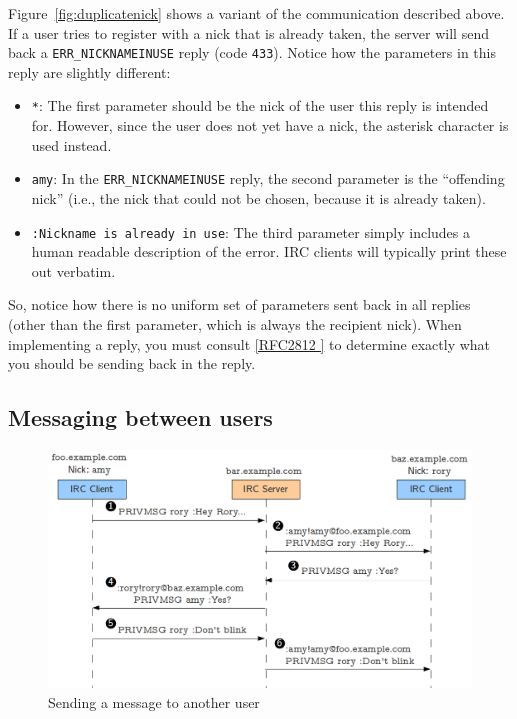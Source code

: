 \documentclass[10pt]{article}
\newcommand{\RFCsection}[2]{\href{http://tools.ietf.org/html/rfc#1\#section-#2}{[RFC#1 \textsection #2]}}
\begin{document}
Figure~\ref{fig:duplicatenick} shows a variant of the communication described above. If a user tries to register with a nick that is already taken, the server will send back a \texttt{ERR\_NICKNAMEINUSE} reply (code \texttt{433}). Notice how the parameters in this reply are slightly different:

\begin{itemize}
\item \texttt{*}: The first parameter should be the nick of the user this reply is intended for. However, since the user does not yet have a nick, the asterisk character is used instead.
\item \texttt{amy}: In the \texttt{ERR\_NICKNAMEINUSE} reply, the second parameter is the ``offending nick'' (i.e., the nick that could not be chosen, because it is already taken).
\item \texttt{:Nickname is already in use}: The third parameter simply includes a human readable description of the error. IRC clients will typically print these out verbatim.
\end{itemize}

So, notice how there is no uniform set of parameters sent back in all replies (other than the first parameter, which is always the recipient nick). When implementing a reply, you must consult \RFCsection{2812}{5} to determine exactly what you should be sending back in the reply.

\subsection{Messaging between users}
\label{sec:privmsg}

\begin{figure}
\begin{center}
\includegraphics[width=1\textwidth]{privmsg.png}
\caption{Sending a message to another user}
\label{fig:privmsg}
\end{center}
\end{figure}
\end{document}
